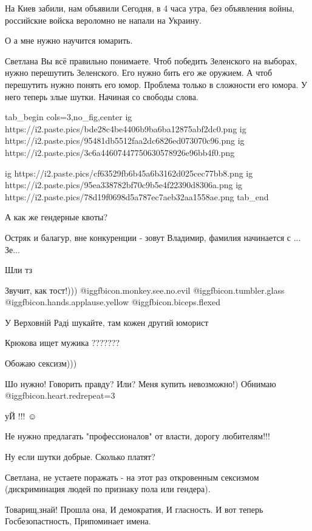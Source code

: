 \begin{itemize}

На Киев забили, нам объявили
Сегодня, в 4 часа утра, без объявления войны, российские войска вероломно не напали на Украину.


О а мне нужно научится юмарить.

Светлана Вы всё правильно понимаете. Чтоб победить Зеленского на выборах, нужно
перешутить Зеленского. Его нужно бить его же оружием. А чтоб перешутить нужно
понять его юмор. Проблема только в сложности его юмора. У него теперь злые
шутки. Начиная со свободы слова.

\ifcmt
tab_begin cols=3,no_fig,center
  ig https://i2.paste.pics/bde28c4be4406b9ba6ba12875abf2dc0.png
	ig https://i2.paste.pics/95481db5512faa2dc6826ed073070c96.png
	ig https://i2.paste.pics/3c6a44607447750630578926e96bb4f0.png

	ig https://i2.paste.pics/cf63529fb6b45a6b3162d025cec77bb8.png
	ig https://i2.paste.pics/95ea338782bf70c9b5e4f22390d8306a.png
	ig https://i2.paste.pics/78d19f0698d5a787ec7aeb32aa1558ae.png
tab_end
\fi

А как же гендерные квоты?

Остряк и балагур, вне конкуренции - зовут Владимир, фамилия начинается с ... Зе...

Шли тз


Звучит, как тост!))) @igg{fbicon.monkey.see.no.evil}  @igg{fbicon.tumbler.glass} 
@igg{fbicon.hands.applause.yellow}  @igg{fbicon.biceps.flexed} 

У Верховній Раді шукайте, там кожен другий юморист

Крюкова ищет мужика ???????

Обожаю сексизм)))

Шо нужно!
Говорить правду?
Или?
Меня купить невозможно!)
Обнимаю @igg{fbicon.heart.red}{repeat=3}

уЙ !!! ☺

Не нужно предлагать "профессионалов" от власти, дорогу любителям!!!

Ну если шутки добрые. Сколько платят?

Светлана, не устаете поражать - на этот раз откровенным сексизмом (дискриминация людей по признаку пола или гендера).

Товарищ,знай! Прошла она, И демократия, И гласность. И вот теперь Госбезопастность, Припоминает имена.


\end{itemize}
